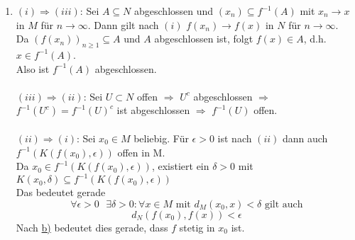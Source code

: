 \begin{prop}
\begin{beweis}
\begin{enumerate}[label=\alph*\upshape)]
			\item $(i) \Rightarrow (iii)$: Sei $A \subseteq N$ abgeschlossen und $(x_{n}) \subseteq f^{-1}(A)$ mit $x_{n} \rightarrow x$ in $M$ für $n \rightarrow \infty$. Dann gilt nach $(i)$ $f(x_{n}) \rightarrow f(x)$ in $N$ für $n \rightarrow \infty$. \\
				Da $(f(x_{n}))_{n \geq 1} \subseteq A$ und $A$ abgeschlossen ist, folgt $f(x) \in A$, d.h. $x \in f^{-1}(A)$. \\
				Also ist $f^{-1}(A)$ abgeschlossen. \\ \\
				$(iii) \Rightarrow (ii)$: Sei $U \subset N$ offen $\Rightarrow$ $U^{c}$ abgeschlossen $\Rightarrow$ $f^{-1}(U^{c}) = f^{-1}(U)^{c}$ ist abgeschlossen $\Rightarrow$ $f^{-1}(U)$ offen. \\ \\
				$(ii) \Rightarrow (i)$: 	Sei $x_{0} \in M$ beliebig. Für $\epsilon > 0$ ist nach $(ii)$ dann auch $f^{-1}(K(f(x_{0}), \epsilon))$ offen in M. \\
				Da $x_{0} \in f^{-1}(K(f(x_{0}), \epsilon))$, existiert ein $\delta > 0$ mit $K(x_{0}, \delta) \subseteq f^{-1}(K(f(x_{0}),\epsilon))$\\
				Das bedeutet gerade
				\[ \forall \epsilon > 0 \text{ } \exists \delta > 0: \forall x \in M \text{ mit } d_{M}(x_{0}, x) < \delta \text{ gilt auch} \]
				\[ d_{N}(f(x_{0}), f(x)) < \epsilon \]
				Nach \hyperref[prop:1-4.13.b]{b)} bedeutet dies gerade, dass $f$ stetig in $x_{0}$ ist.
		\end{enumerate}
	\end{beweis}
\end{prop}

